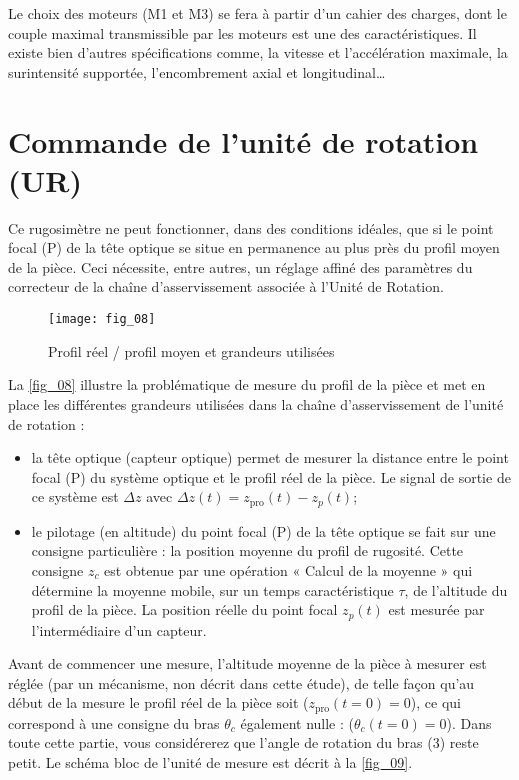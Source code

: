 \ifprof
\else
Le choix des moteurs (M1 et M3) se fera à partir d’un cahier des charges, dont le couple maximal
transmissible par les moteurs est une des caractéristiques. Il existe bien d’autres spécifications comme, la
vitesse et l’accélération maximale, la surintensité supportée, l’encombrement axial et longitudinal…
\fi

\section{Commande de l'unité de rotation (UR)}
\ifprof
\else
Ce rugosimètre ne peut fonctionner, dans des conditions idéales, que si le point focal (P) de la tête optique
se situe en permanence au plus près du profil moyen de la pièce. Ceci nécessite, entre autres, un réglage
affiné des paramètres du correcteur de la chaîne d’asservissement associée à l’Unité de Rotation.

\begin{figure}[H]
\centering
\texttt{[image: fig\_08]}
\caption{\label{fig_08} Profil réel / profil moyen et grandeurs utilisées}
\end{figure}

La \autoref{fig_08} illustre la problématique de mesure du profil de la pièce et met en place les différentes
grandeurs utilisées dans la chaîne d’asservissement de l’unité de rotation :
\begin{itemize}
\item la tête optique (capteur optique) permet de mesurer la distance entre le point focal (P) du système
optique et le profil réel de la pièce. Le signal de sortie de ce système est $\Delta z$ avec
$\Delta z(t)=z_{\text{pro}}(t)-z_p(t)$;
\item le pilotage (en altitude) du point focal (P) de la tête optique se fait sur une consigne particulière : la
position moyenne du profil de rugosité. Cette consigne $z_c$ est obtenue par une opération « Calcul de
la moyenne » qui détermine la moyenne mobile, sur un temps caractéristique $\tau$, de l’altitude du
profil de la pièce. La position réelle du point focal $z_p(t)$ est mesurée par l’intermédiaire d’un
capteur.
\end{itemize}
Avant de commencer une mesure, l’altitude moyenne de la pièce à mesurer est réglée (par un mécanisme,
non décrit dans cette étude), de telle façon qu’au début de la mesure le profil réel de la pièce soit
($z_{\text{pro}}(t=0)=0$), ce qui correspond à une consigne du bras $\theta_c$ également nulle : ($\theta_{c}(t=0)=0$).
Dans toute cette partie, vous considérerez que l’angle de rotation du bras (3) reste petit.
Le schéma bloc de l’unité de mesure est décrit à la \autoref{fig_09}.


